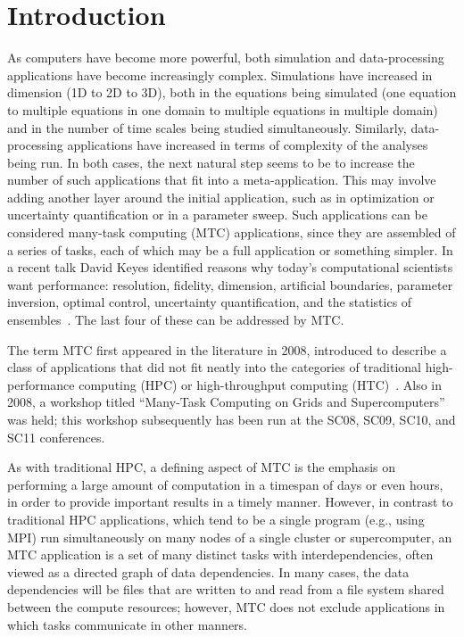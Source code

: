 \documentclass[10pt,letterpaper]{article}
\begin{document}
\setcounter{tocdepth}{2}
\tableofcontents

\pagebreak

\section{Introduction}

As computers have become more powerful,
both simulation and data-processing applications have become increasingly complex.
Simulations have increased in dimension (1D to 2D to 3D),
both in the equations being simulated (one equation to multiple equations in
one domain to multiple equations in multiple domain) and in the number of
time scales being studied simultaneously. Similarly, data-processing applications
have increased in terms of complexity of the analyses being run.
In both cases, the next natural step seems to be to increase the number
of such applications that fit into a meta-application.  This may involve 
adding another layer around the initial application, such as in optimization
or uncertainty quantification or in a parameter sweep.  Such applications
can be considered many-task computing (MTC) applications, since they
are assembled of a series of tasks, each of which may be a full application
or something simpler.
In a recent talk David Keyes identified
reasons why today's computational scientists want performance:
resolution, fidelity, dimension, artificial boundaries, parameter inversion,
optimal control, uncertainty quantification, and the statistics of ensembles~\cite{keyes}.
The last four of these can be addressed by MTC.

The term MTC first appeared in the literature in 2008, introduced to describe
a class of applications that did not fit neatly into the categories
of traditional high-performance computing (HPC) or high-throughput computing
(HTC)~\cite{FALKON-SC-08}.  Also in 2008,  a workshop titled
``Many-Task Computing on Grids and Supercomputers'' was held; this workshop
subsequently has been run at the SC08, SC09, SC10, and SC11 conferences.

As with traditional HPC, a defining aspect of MTC is the emphasis
on performing a large amount of computation in a timespan of days or even hours,
 in order to provide important results in a timely manner.
However, in contrast to traditional HPC applications, which tend to be a single program
(e.g., using MPI) run simultaneously on many nodes of a single cluster or
supercomputer, an MTC application is a set of many distinct tasks
with interdependencies, often viewed as a directed
graph of data dependencies.  In many cases, the data dependencies will
be files that are written to and read from a file system shared between
the compute resources; however, MTC does not exclude applications in which
tasks communicate in other manners.
\end{document}

